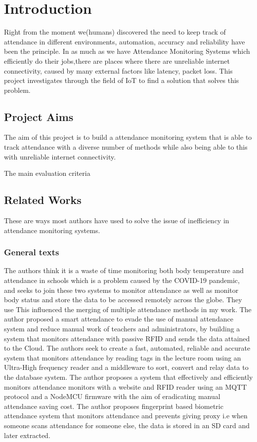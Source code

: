 \chapter{Introduction}
Right from the moment we(humans) discovered the need to keep track of attendance in different environments, automation, accuracy and reliability have been the principle. In as much as we have Attendance Monitoring Systems which efficiently do their jobs,there are places where there are unreliable internet connectivity, caused by many external factors like latency, packet loss. This project investigates through the field of IoT to find a solution that solves this problem.


\section{Project Aims}

The aim of this project is to build a attendance monitoring system that is able to track attendance with a diverse number of methods while also being able to this with unreliable internet connectivity. 

The main evaluation criteria


\section{Related Works} 
These are ways most authors have used to solve the issue of inefficiency in attendance monitoring systems.
\subsection{General texts}
The authors think it is a waste of time monitoring both body temperature and attendance in schools which is a problem caused by the COVID-19 pandemic, and seeks to join these two systems to monitor attendance as well as monitor body status and store the data to be accessed remotely across the globe. They use This influenced the merging of multiple attendance methods in my work.
The author proposed a smart attendance to evade the use of manual attendance system and reduce manual work of teachers and administrators, by building a system that monitors attendance with passive RFID and sends the data attained to the Cloud.
The authors seek to create a fast, automated, reliable and accurate system that monitors attendance by reading tags in the lecture room using an Ultra-High frequency reader and a middleware to sort, convert and relay data to the database system. 
The author proposes a system that effectively and efficiently monitors attendance monitors with a website and RFID reader using an MQTT protocol and a NodeMCU firmware with the aim of eradicating manual attendance saving cost.
The author proposes fingerprint based biometric attendance system that monitors attendance and prevents giving proxy i.e when someone scans attendance for someone else, the data is stored in an SD card and later extracted. 

